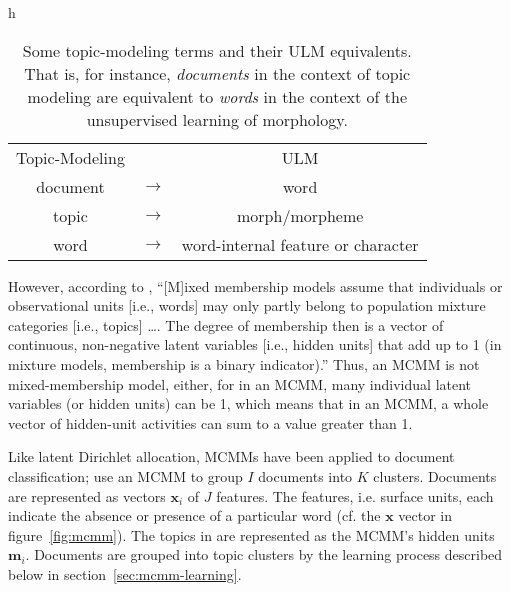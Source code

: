 \begin{table}{h}
\centering
\begin{tabular}{ccc}
Topic-Modeling & & ULM \\
document & $\to$ & word \\ %
topic & $\to$ & morph/morpheme \\
word & $\to$ & word-internal feature or character \\
\end{tabular}
\caption{Some topic-modeling terms and their ULM equivalents. That is, for instance, \emph{documents}
in the context of topic modeling are equivalent to \emph{words} in the context of the unsupervised learning
of morphology.}
\label{tab:tm-to-ulm}
\end{table}
However, according to \citet[][p. 4]{airoldi-et-al:2014}, ``[M]ixed membership models assume that individuals or observational units [i.e., words] may only partly belong to population mixture categories [i.e., topics] \dots. The degree of membership then is a vector of continuous, non-negative latent variables [i.e., hidden units] that add up to 1 (in mixture models, membership is a binary indicator).''
 Thus, an MCMM is not mixed-membership model, either, for in an MCMM, many individual latent variables (or hidden units) can be 1, which means that in an MCMM, a whole vector of hidden-unit activities can sum to a value greater than 1.


Like latent Dirichlet allocation, MCMMs have
been applied to document classification; \cite{sahami-et-al:96} 
use an \ac{MCMM} to group $I$ documents into $K$ clusters.  Documents are 
represented as vectors $\mathbf{x}_i$ of $J$ features. The features, i.e. surface units, 
each indicate the absence or presence of a particular word (cf. the $\mathbf{x}$ 
vector in figure~\ref{fig:mcmm}). The topics in \cite{sahami-et-al:96} are represented 
as the MCMM's hidden units $\mathbf{m}_i$. Documents are grouped into topic 
clusters by the learning process described below in section~\ref{sec:mcmm-learning}.

